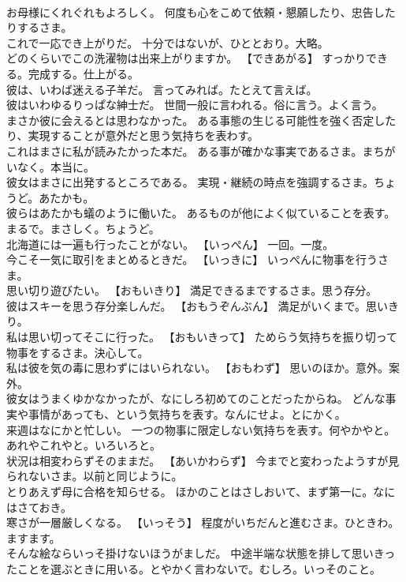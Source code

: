 \documentclass[8pt]{extreport}
\begin{document}
\begin{CJK}{UTF8}{min}
\\	お母様にくれぐれもよろしく。	何度も心をこめて依頼・懇願したり、忠告したりするさま。
\\	これで一応でき上がりだ。	十分ではないが、ひととおり。大略。
\\	どのくらいでこの洗濯物は出来上がりますか。	【できあがる】 すっかりできる。完成する。仕上がる。
\\	彼は、いわば迷える子羊だ。	言ってみれば。たとえて言えば。
\\	彼はいわゆるりっぱな紳士だ。	世間一般に言われる。俗に言う。よく言う。
\\	まさか彼に会えるとは思わなかった。	ある事態の生じる可能性を強く否定したり、実現することが意外だと思う気持ちを表わす。
\\	これはまさに私が読みたかった本だ。	ある事が確かな事実であるさま。まちがいなく。本当に。
\\	彼女はまさに出発するところである。	実現・継続の時点を強調するさま。ちょうど。あたかも。
\\	彼らはあたかも蟻のように働いた。	あるものが他によく似ていることを表す。まるで。まさしく。ちょうど。
\\	北海道には一遍も行ったことがない。	【いっぺん】 一回。一度。
\\	今こそ一気に取引をまとめるときだ。	【いっきに】 いっぺんに物事を行うさま。
\\	思い切り遊びたい。	【おもいきり】 満足できるまでするさま。思う存分。
\\	彼はスキーを思う存分楽しんだ。	【おもうぞんぶん】 満足がいくまで。思いきり。
\\	私は思い切ってそこに行った。	【おもいきって】 ためらう気持ちを振り切って物事をするさま。決心して。
\\	私は彼を気の毒に思わずにはいられない。	【おもわず】 思いのほか。意外。案外。
\\	彼女はうまくゆかなかったが、なにしろ初めてのことだったからね。	どんな事実や事情があっても、という気持ちを表す。なんにせよ。とにかく。
\\	来週はなにかと忙しい。	一つの物事に限定しない気持ちを表す。何やかやと。あれやこれやと。いろいろと。
\\	状況は相変わらずそのままだ。	【あいかわらず】 今までと変わったようすが見られないさま。以前と同じように。
\\	とりあえず母に合格を知らせる。	ほかのことはさしおいて、まず第一に。なにはさておき。
\\	寒さが一層厳しくなる。	【いっそう】 程度がいちだんと進むさま。ひときわ。ますます。
\\	そんな絵ならいっそ掛けないほうがましだ。	中途半端な状態を排して思いきったことを選ぶときに用いる。とやかく言わないで。むしろ。いっそのこと。

\end{CJK}
\end{document}
